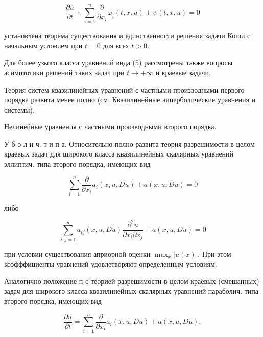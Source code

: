 \documentclass[10pt]{article}
\begin{document}
\[

\frac{\partial u}{\partial t}+\sum_{i=1}^{n} \frac{\partial}{\partial x_{i}} \varphi_{i}(t, x, u)+\psi(t, x, u)=0

\]



установлена теорема существования и единственности решения задачи Коши с начальным условием при $t=0$ для всех $t>0$.



Для более узкого класса уравнений вида (5) рассмотрены также вопросы асимптотики решений таких задач при $t \rightarrow+\infty$ и краевые задачи.



Теория систем квазилинейных уравнений с частными производными первого порядка развита менее полно (см. Квазилинейные аиперболические уравнения и системы).



Нелинейные уравнения с частными производными второго порядка.



У б о л и ч. т и п а. Относительно полно развита теория разрешимости в целом краевых задач для широкого класса квазилинейных скалярных уравнений эллиптич. типа второго порядка, имеющих вид



\[

\sum_{i=1}^{n} \frac{\partial}{\partial x_{i}} a_{i}(x, u, D u)+a(x, u, D u)=0

\]



либо



\[

\sum_{i, j=1}^{n} a_{i j}(x, u, D u) \frac{\partial^{2} u}{\partial x_{i} \partial x_{j}}+a(x, u, D u)=0

\]



при условии существования априорной оценки $\max _{x}|u(x)|$. При этом коэфффициенты уравнений удовлетворяют определенным условиям.



Аналогично положение п с теорией разрешимости в целом краевых (смешанных) задач для широкого класса квазилинейных скалярных уравнений параболич. типа второго порядка, имеющих вид



\[

\frac{\partial u}{\partial t}=\sum_{i=1}^{n} \frac{\partial}{\partial x_{i}} a_{i}(x, u, D u)+a(x, u, D u),

\]
\end{document}
